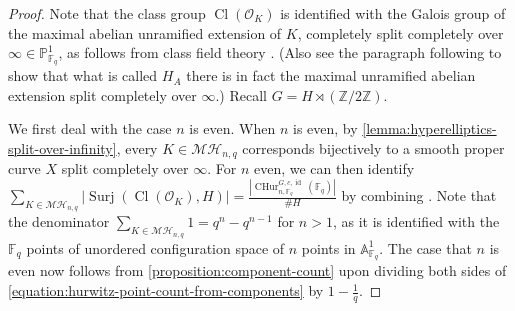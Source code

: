 \documentclass[12 pt]{amsart}
\theoremstyle{plain}
\theoremstyle{definition}
\theoremstyle{remark}
\numberwithin{equation}{section}
\DeclareMathOperator\id{id}
\DeclareMathOperator\cl{Cl}
\newcommand{\boundarycphur}[5]{\operatorname{CHur}^{#1, #3, #5}_{#2, #4}}
\DeclareMathOperator\surj{Surj}
\begin{document}
\begin{proof}
Note that the class group
$\cl(\mathscr O_K)$ is identified with the Galois group of the 
maximal abelian unramified extension
of $K$, completely split completely over $\infty \in \mathbb P^1_{\mathbb F_q}$, as follows from class field theory
\cite[15.6]{hayes:a-brief-introduction-to-drinfield-modules}.
(Also see the paragraph following 
\cite[15.6]{hayes:a-brief-introduction-to-drinfield-modules}
to show that what is called $H_A$ there
is in fact the maximal unramified abelian extension split completely over
$\infty$.)
Recall $G = H \rtimes (\mathbb Z/2 \mathbb Z)$.

We first deal with the case $n$ is even.
When $n$ is even, by \autoref{lemma:hyperelliptics-split-over-infinity},
every $K \in
\mathcal{MH}_{n,q}$ corresponds bijectively to a smooth proper curve $X$
split completely over $\infty$.
For $n$ even,
we can then identify $\sum_{K \in \mathcal{MH}_{n,q}} \left|\surj(\cl(\mathscr
O_K), H)\right|= \frac{ \left|\boundarycphur G n c {\mathbb F_q} {\id} (\mathbb F_q)
\right|}{\# H}$
by combining
\cite[Lemma 9.3 and Lemma 10.2]{liuWZB:a-predicted-distribution}.
Note that the denominator $\sum_{K \in \mathcal{MH}_{n,q}} 1 = q^n - q^{n-1}$
for $n > 1$,
as it is identified with the $\mathbb F_q$ points of unordered configuration
space of $n$ points in $\mathbb A^1_{\mathbb F_q}$.
The case that $n$ is even now follows from
\autoref{proposition:component-count} upon dividing both sides of
\eqref{equation:hurwitz-point-count-from-components} by $1
-\frac{1}{q}$.


\end{proof}
\end{document}

